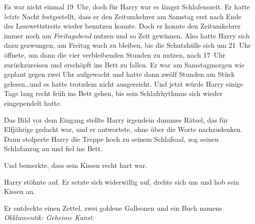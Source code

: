 Es war nicht einmal 19~Uhr, doch für Harry war es längst Schlafenszeit. Er hatte \emph{letzte} Nacht festgestellt, dass er den Zeitumkehrer am Samstag erst nach Ende des Lesewettstreits wieder benutzen konnte. Doch er konnte den Zeitumkehrer immer noch am \emph{Freitagabend} nutzen und so Zeit gewinnen. Also hatte Harry sich dazu gezwungen, am Freitag wach zu bleiben, bis die Schutzhülle sich um 21~Uhr öffnete, um dann die vier verbleibenden Stunden zu nutzen, nach 17~Uhr zurückzureisen und erschöpft ins Bett zu fallen. Er war am Samstagmorgen wie geplant gegen zwei Uhr aufgewacht und hatte dann zwölf Stunden am Stück gelesen…und es hatte trotzdem nicht ausgereicht. Und jetzt würde Harry einige Tage lang recht früh ins Bett gehen, bis sein Schlafrhythmus sich wieder eingependelt hatte.

Das Bild vor dem Eingang stellte Harry irgendein dummes Rätsel, das für Elfjährige gedacht war, und er antwortete, ohne über die Worte nachzudenken. Dann stolperte Harry die Treppe hoch zu seinem Schlafsaal, zog seinen Schlafanzug an und fiel ins Bett.

Und bemerkte, dass sein Kissen recht hart war.

Harry stöhnte auf. Er setzte sich widerwillig auf, drehte sich um und hob sein Kissen an.

Er entdeckte einen Zettel, zwei goldene Galleonen und ein Buch namens \emph{Okklumentik: Geheime Kunst}.

